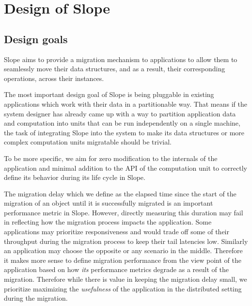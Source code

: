 \chapter{Design of Slope}
\label{chap:design}


\section{Design goals}

Slope aims to provide a migration mechanism to applications to allow them to
seamlessly move their data structures, and as a result, their corresponding
operations, across their instances.

The most important design goal of Slope is being pluggable in existing
applications which work with their data in a partitionable way. That means if
the system designer has already came up with a way to partition
application data and computation into units that can be run independently on a
single machine, the task of integrating Slope into the system to make its data
structures or more complex computation units migratable should be trivial.

To be more specific, we aim for zero modification to the internals of the
application and minimal addition to the API of the computation unit to
correctly define its behavior during its life cycle in Slope.

The migration delay which we define as the elapsed time since the start of the
migration of an object until it is successfully migrated is an important
performance metric in Slope. However, directly measuring this duration may fail
in reflecting how the migration process impacts the application. Some
applications may prioritize responsiveness and would trade off some of their
throughput during the migration process to keep their tail latencies low.
Similarly an application may choose the opposite or any scenario in the middle.
Therefore it makes more sense to define migration performance from the view
point of the application based on how \emph{its} performance metrics degrade
as a result of the migration. Therefore while there is value in keeping the
migration delay small, we prioritize maximizing the \emph{usefulness} of the
application in the distributed setting during the migration.

